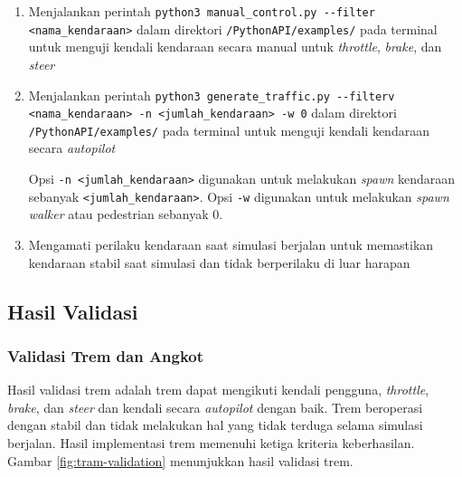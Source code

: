 \begin{enumerate}

    \item Menjalankan perintah \verb|python3 manual_control.py --filter|
    \verb|<nama_kendaraan>| dalam direktori \verb|/PythonAPI/examples/| pada
    terminal untuk menguji kendali kendaraan secara manual untuk
    \textit{throttle}, \textit{brake}, dan \textit{steer}

    \item Menjalankan perintah \verb|python3 generate_traffic.py --filterv|
    \verb|<nama_kendaraan> -n <jumlah_kendaraan> -w 0| dalam direktori \verb|/PythonAPI/examples/|
    pada terminal untuk menguji kendali kendaraan secara \textit{autopilot}

    Opsi \verb|-n <jumlah_kendaraan>| digunakan untuk melakukan \textit{spawn}
    kendaraan sebanyak \verb|<jumlah_kendaraan>|. Opsi \verb|-w| digunakan untuk
    melakukan \textit{spawn} \textit{walker} atau pedestrian sebanyak 0.

    \item Mengamati perilaku kendaraan saat simulasi berjalan untuk memastikan
    kendaraan stabil saat simulasi dan tidak berperilaku di luar harapan

\end{enumerate}

\subsection{Hasil Validasi}


\subsubsection{Validasi Trem dan Angkot}

Hasil validasi trem adalah trem dapat mengikuti kendali pengguna,
\textit{throttle}, \textit{brake}, dan \textit{steer} dan kendali secara
\textit{autopilot} dengan baik. Trem beroperasi dengan stabil dan tidak
melakukan hal yang tidak terduga selama simulasi berjalan. Hasil implementasi
trem memenuhi ketiga kriteria keberhasilan. Gambar \ref{fig:tram-validation}
menunjukkan hasil validasi trem.

